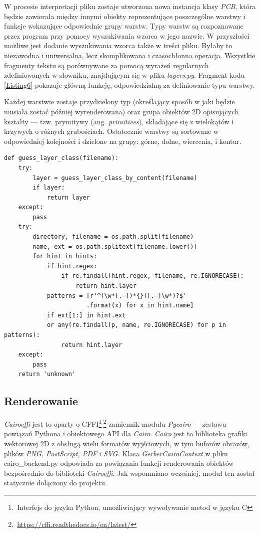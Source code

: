 \documentclass{xmgr}
\begin{document}
W procesie interpretacji pliku zostaje utworzona nowa instancja klasy \emph{PCB}, która będzie zawierała między innymi obiekty reprezentujące poszczególne warstwy i funkcje wskazujące odpowiednie grupy warstw. Typy warstw są rozpoznawane przez program przy pomocy wyszukiwania wzorca w jego nazwie. W przyszłości możliwe jest dodanie wyszukiwania wzorca także w treści pliku. Byłaby to niezawodna i uniwersalna, lecz skomplikowana i czasochłonna operacja. Wszystkie fragmenty tekstu są porównywane za pomocą wyrażeń regularnych zdefiniowanych w słowniku, znajdującym się w pliku \emph{layers.py}. Fragment kodu \ref{Listing6} pokazuje główną funkcję, odpowiedzialną za definiowanie typu warstwy.

Każdej warstwie zostaje przydzielony typ (określający sposób w jaki będzie musiała zostać później wyrenderowana) oraz grupa obiektów 2D opisujących kształty --- tzw. prymitywy (ang. \emph{primitives}), składające się z wielokątów i krzywych o różnych grubościach. Ostatecznie warstwy są sortowane w odpowiedniej kolejności i dzielone na grupy: górne, dolne, wiercenia, i kontur.

\newpage
{}
\begin{lstlisting}
def guess_layer_class(filename):
    try:
        layer = guess_layer_class_by_content(filename)
        if layer:
            return layer
    except:
        pass
    try:
        directory, filename = os.path.split(filename)
        name, ext = os.path.splitext(filename.lower())
        for hint in hints:
            if hint.regex:
                if re.findall(hint.regex, filename, re.IGNORECASE):
                    return hint.layer
            patterns = [r'^(\w*[.-])*{}([.-]\w*)?$'
                       .format(x) for x in hint.name]
            if ext[1:] in hint.ext 
            or any(re.findall(p, name, re.IGNORECASE) for p in patterns):
                return hint.layer
    except:
        pass
    return 'unknown'
\end{lstlisting}

\subsection{Renderowanie}
\emph{Cairocffi} jest to oparty o CFFI\footnote{\,Interfejs do języka Python, umożliwiający wywoływanie metod w języku C}$^{,}$\footnote{\,\url{https://cffi.readthedocs.io/en/latest/}} zamiennik modułu \emph{Pycairo} --- zestawu powiązań Pythona i obiektowego API dla \emph{Cairo}. \emph{Cairo} jest to biblioteka grafiki wektorowej 2D z obsługą wielu formatów wyjściowych, w tym buforów obrazów, plików \emph{PNG, PostScript, PDF} i \emph{SVG}. 
Klasa \emph{GerberCairoContext} w pliku cairo\_backend.py odpowiada za powiązania funkcji renderowania obiektów bezpośrednio do biblioteki \emph{Cairocffi}. Jak wspomniano wcześniej, moduł ten został statycznie dołączony do projektu.
\end{document}

